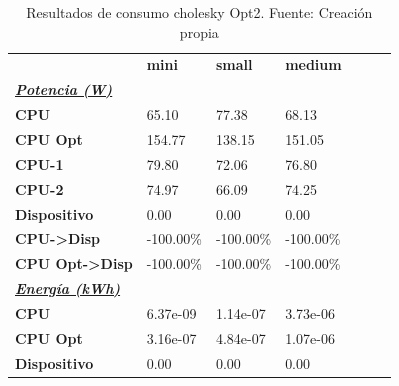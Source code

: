 \begin{table}[H]
    \centering
    \begin{tabular}{lllllll}
    \rowcolor[HTML]{DAE8FC} \ & \textbf{mini} & \textbf{	small} & \textbf{	medium} \\
    \cellcolor[HTML]{DAE8FC} \textbf{\textbf{{\emph{{\underline{{Potencia (W)}}}}}}} &  & 	 & 	 \\
    \rowcolor[HTML]{EFEFEF} \cellcolor[HTML]{DAE8FC} \textbf{CPU} & 65.10 & 	77.38 & 	68.13 \\
    \cellcolor[HTML]{DAE8FC} \textbf{CPU Opt} & 154.77 & 	138.15 & 	151.05 \\
    \rowcolor[HTML]{EFEFEF} \cellcolor[HTML]{DAE8FC} \textbf{\quad CPU-1} & 79.80 & 	72.06 & 	76.80 \\
    \cellcolor[HTML]{DAE8FC} \textbf{\quad CPU-2} & 74.97 & 	66.09 & 	74.25 \\
    \rowcolor[HTML]{EFEFEF} \cellcolor[HTML]{DAE8FC} \textbf{Dispositivo} & 0.00 & 	0.00 & 	0.00 \\
    \cellcolor[HTML]{DAE8FC} \textbf{CPU->Disp} & -100.00\% & 	-100.00\% & 	-100.00\% \\
    \rowcolor[HTML]{EFEFEF} \cellcolor[HTML]{DAE8FC} \textbf{CPU Opt->Disp} & -100.00\% & 	-100.00\% & 	-100.00\% \\
    \cellcolor[HTML]{DAE8FC} \textbf{\textbf{{\emph{{\underline{{Energía (kWh)}}}}}}} &  & 	 & 	 \\
    \rowcolor[HTML]{EFEFEF} \cellcolor[HTML]{DAE8FC} \textbf{CPU} & 6.37e-09 & 	1.14e-07 & 	3.73e-06 \\
    \cellcolor[HTML]{DAE8FC} \textbf{CPU Opt} & 3.16e-07 & 	4.84e-07 & 	1.07e-06 \\
    \rowcolor[HTML]{EFEFEF} \cellcolor[HTML]{DAE8FC} \textbf{Dispositivo} & 0.00 & 	0.00 & 	0.00 \\
    \end{tabular}
    \caption[Resultados de consumo cholesky Opt2]{{Resultados de consumo cholesky Opt2. Fuente: Creación propia}}
    \label{table_test_cholesky_Opt2_hw_powerResults}
\end{table}